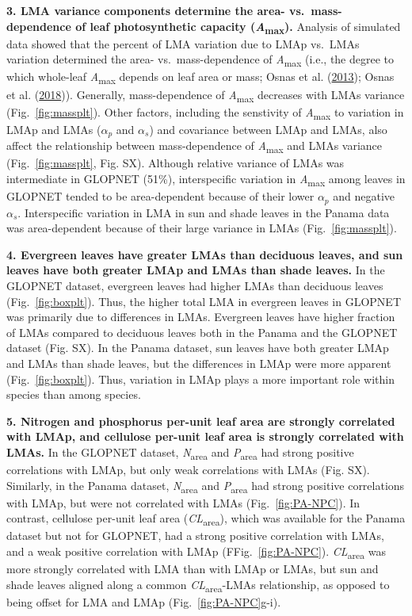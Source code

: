 \documentclass[
  12pt,
]{article}
\begin{document}
\textbf{3. LMA variance components determine the area- vs.~mass-dependence of leaf photosynthetic capacity (\emph{A}\textsubscript{max}).}
Analysis of simulated data showed that the percent of LMA variation due to LMAp vs.~LMAs variation determined the area- vs.~mass-dependence of \emph{A}\textsubscript{max} (i.e., the degree to which whole-leaf \emph{A}\textsubscript{max} depends on leaf area or mass; Osnas et al. (\protect\hyperlink{ref-Osnas2013}{2013}); Osnas et al. (\protect\hyperlink{ref-Osnas2018}{2018})).
Generally, mass-dependence of \emph{A}\textsubscript{max} decreases with LMAs variance (Fig.~\ref{fig:massplt}).
Other factors, including the senstivity of \emph{A}\textsubscript{max} to variation in LMAp and LMAs (\(\alpha_p\) and \(\alpha_s\)) and covariance between LMAp and LMAs, also affect the relationship between mass-dependence of \emph{A}\textsubscript{max} and LMAs variance (Fig.~\ref{fig:massplt}, Fig. SX).
Although relative variance of LMAs was intermediate in GLOPNET (51\%), interspecific variation in \emph{A}\textsubscript{max} among leaves in GLOPNET tended to be area-dependent because of their lower \(\alpha_p\) and negative \(\alpha_s\).
Interspecific variation in LMA in sun and shade leaves in the Panama data was area-dependent because of their large variance in LMAs (Fig.~\ref{fig:massplt}).

\textbf{4. Evergreen leaves have greater LMAs than deciduous leaves, and sun leaves have both greater LMAp and LMAs than shade leaves.}
In the GLOPNET dataset, evergreen leaves had higher LMAs than deciduous leaves (Fig.~\ref{fig:boxplt}).
Thus, the higher total LMA in evergreen leaves in GLOPNET was primarily due to differences in LMAs.
Evergreen leaves have higher fraction of LMAs compared to deciduous leaves both in the Panama and the GLOPNET dataset (Fig. SX).
In the Panama dataset, sun leaves have both greater LMAp and LMAs than shade leaves, but the differences in LMAp were more apparent (Fig.~\ref{fig:boxplt}).
Thus, variation in LMAp plays a more important role within species than among species.

\textbf{5. Nitrogen and phosphorus per-unit leaf area are strongly correlated with LMAp, and cellulose per-unit leaf area is strongly correlated with LMAs.}
In the GLOPNET dataset, \emph{N}\textsubscript{area} and \emph{P}\textsubscript{area} had strong positive correlations with LMAp, but only weak correlations with LMAs (Fig. SX).
Similarly, in the Panama dataset, \emph{N}\textsubscript{area} and \emph{P}\textsubscript{area} had strong positive correlations with LMAp, but were not correlated with LMAs (Fig.~\ref{fig:PA-NPC}).
In contrast, cellulose per-unit leaf area (\emph{CL}\textsubscript{area}), which was available for the Panama dataset but not for GLOPNET, had a strong positive correlation with LMAs, and a weak positive correlation with LMAp (FFig.~\ref{fig:PA-NPC}).
\emph{CL}\textsubscript{area} was more strongly correlated with LMA than with LMAp or LMAs, but sun and shade leaves aligned along a common \emph{CL}\textsubscript{area}-LMAs relationship, as opposed to being offset for LMA and LMAp (Fig.~\ref{fig:PA-NPC}g-i).
\end{document}
